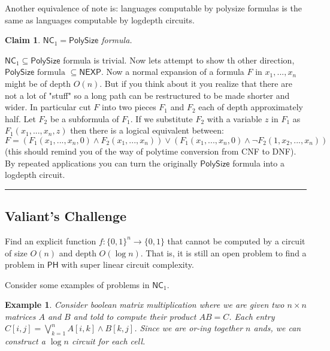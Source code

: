 \documentclass[twoside]{article}
\newtheorem{claim}[theorem]{Claim}
\newtheorem{example}[theorem]{Example}
\newenvironment{proof}{{\bf Proof:}}{\hfill\rule{2mm}{2mm}}
\def\PH{\mathsf{PH}}
\def\NEXP{\mathsf{NEXP}}
\def\PolySize{\mathsf{PolySize}}
\def\NC{\mathsf{NC}}
\begin{document}
Another equivalence of note is: languages computable by polysize formulas is the same as languages computable by logdepth circuits. 

\begin{claim}
$\NC_1 = \PolySize$ formula.
\end{claim}
\begin{proof}
$\NC_1 \subseteq \PolySize$ formula is trivial. Now lets attempt to show th other direction, $\PolySize \mbox{ formula } \subseteq \NEXP$. Now a normal expansion of a formula $F$ in $x_1, ..., x_n$ might be of depth $O(n)$. But if you think about it you realize that there are not a lot of "stuff" so a long path can be restructured to be made shorter and wider. In particular cut $F$ into two pieces $F_1$ and $F_2$ each of depth approximately half. Let $F_2$ be a subformula of $F_1$. If we substitute $F_2$ with a variable $z$ in $F_1$ as $F_1(x_1, ..., x_n, z)$ then there is a logical equivalent between:
\[F = (F_1(x_1, ..., x_n, 0) \land F_2(x_1, ..., x_n)) \lor (F_1(x_1, ..., x_n, 0) \land \lnot F_2(1, x_2, ..., x_n))\]
(this should remind you of the way of polytime conversion from CNF to DNF). By repeated applications you can turn the originally $\PolySize$ formula into a logdepth circuit.  
\end{proof}

\subsection{Valiant's Challenge}
Find an explicit function $f: \{0,1\}^{n} \rightarrow \{0,1\}$ that cannot be computed by a circuit of size $O(n)$ and depth $O(\log n)$. That is, it is still an open problem to find a problem in $\PH$ with super linear circuit complexity.  

Consider some examples of problems in $\NC_1$.

\begin{example}
Consider boolean matrix multiplication where we are given two $n \times n$ matrices $A$ and $B$ and told to compute their product $AB = C$. Each entry $C[i,j] = \bigvee_{k = 1}^{n} A[i,k] \land B[k,j]$. Since we are or-ing together $n$ ands, we can construct a $\log n$ circuit for each cell. 
\end{example}
\end{document}
